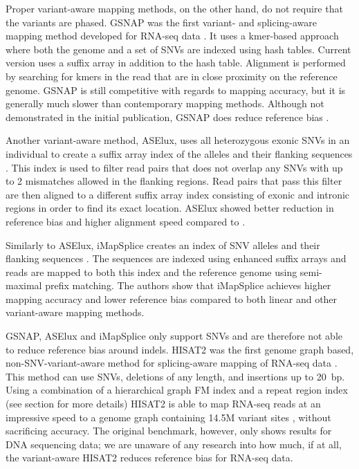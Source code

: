 Proper variant-aware mapping methods, on the other hand, do not require that the variants are phased.
GSNAP was the first variant- and splicing-aware mapping method developed for RNA-seq data \cite{Wu2010-hv}.
It uses a kmer-based approach where both the genome and a set of SNVs are indexed using hash tables.
Current version uses a suffix array in addition to the hash table.
Alignment is performed by searching for kmers in the read that are in close proximity on the reference genome.
GSNAP is still competitive with regards to mapping accuracy, but it is generally much slower than contemporary mapping methods.
Although not demonstrated in the initial publication, GSNAP does reduce reference bias \cite{Castel2015-ef}.

Another variant-aware method, ASElux, uses all heterozygous exonic SNVs in an individual to create a suffix array index of the alleles and their flanking sequences \cite{Miao2018-ps}. 
This index is used to filter read pairs that does not overlap any SNVs with up to 2 mismatches allowed in the flanking regions. 
Read pairs that pass this filter are then aligned to a different suffix array index consisting of exonic and intronic regions in order to find its exact location. 
ASElux showed better reduction in reference bias and higher alignment speed compared to .

Similarly to ASElux, iMapSplice creates an index of SNV alleles and their flanking sequences \cite{Liu_2018}.
The sequences are indexed using enhanced suffix arrays and reads are mapped to both this index and the reference genome using semi-maximal prefix matching.
The authors show that iMapSplice achieves higher mapping accuracy and lower reference bias compared to both linear and other variant-aware mapping methods.

GSNAP, ASElux and iMapSplice only support SNVs and are therefore not able to reduce reference bias around indels.
HISAT2 was the first genome graph based, non-SNV-variant-aware method for splicing-aware mapping of RNA-seq data \cite{Kim_2019}. 
This method can use SNVs, deletions of any length, and insertions up to 20~bp.
Using a combination of a hierarchical graph FM index and a repeat region index (see  section for more details) HISAT2 is able to map RNA-seq reads at an impressive speed to a genome graph containing 14.5M variant sites , without sacrificing accuracy. 
The original benchmark, however, only shows results for DNA sequencing data; we are unaware of any research into how much, if at all, the variant-aware HISAT2 reduces reference bias for RNA-seq data.

